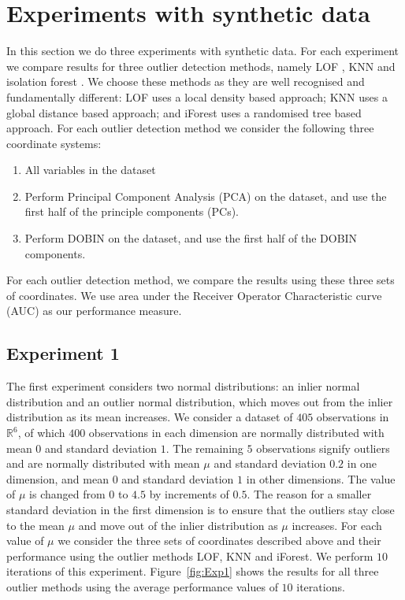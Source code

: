 \documentclass[a4paper,11pt]{article}
\begin{document}
\section{Experiments with synthetic data}\label{sec:synthetic}
In this section we do three experiments with synthetic data. For each experiment we compare results for three outlier detection methods, namely LOF \citep{breunig2000lof}, KNN \citep{ramaswamy2000efficient} and isolation forest \citep{liu2008isolation}. We choose these methods as they are well recognised and fundamentally different: LOF uses a local density based approach; KNN uses a global distance based approach; and iForest uses a randomised tree based approach.  For each outlier detection method we consider the following three coordinate systems:
\begin{enumerate}
\item All variables in the dataset
\item Perform Principal Component Analysis (PCA) on the dataset, and use the first half of the principle components (PCs).
\item Perform DOBIN on the dataset, and use the first half of the DOBIN components.
\end{enumerate}
For each outlier detection method, we compare the results using these three sets of coordinates. We use area under the Receiver Operator Characteristic curve (AUC) as our performance measure.


\subsection{Experiment 1}
The first experiment considers two normal distributions: an  inlier normal distribution and an outlier normal distribution, which moves out from the inlier distribution as its mean increases. We consider a dataset of $405$ observations in $\mathbb{R}^6$, of which $400$ observations in each dimension are normally distributed with mean $0$ and standard deviation $1$. The remaining $5$ observations signify outliers and are normally distributed with mean $\mu$ and standard deviation $0.2$ in one dimension, and mean $0$ and standard deviation $1$ in other dimensions. The value of $\mu$ is changed from $0$ to $4.5$ by increments of $0.5$. The reason for a smaller standard deviation in the first dimension is to ensure that the outliers stay close to the mean $\mu$ and move out of the inlier distribution as $\mu$ increases. For each value of $\mu$ we consider the three sets of coordinates described above and their performance using the outlier methods LOF, KNN and iForest.  We perform $10$ iterations of this experiment. Figure~\ref{fig:Exp1} shows the results for all three  outlier methods using the average performance values of $10$ iterations.
\end{document}
